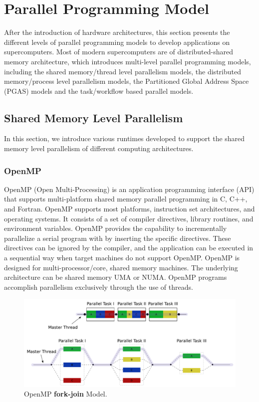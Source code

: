 \section{Parallel Programming Model}\label{Parallel Programming Model}

After the introduction of hardware architectures, this section presents the different levels of parallel programming models to develop applications on supercomputers. Most of modern supercomputers are of distributed-shared memory architecture, which introduces multi-level parallel programming models, including the shared memory/thread level parallelism models, the distributed memory/process level parallelism models, the Partitioned Global Address Space (PGAS) models and the task/workflow based parallel models.

\subsection{Shared Memory Level Parallelism}

In this section, we introduce various runtimes developed to support the shared memory level parallelism of different computing architectures. 

\subsubsection{OpenMP}

OpenMP (Open Multi-Processing) \cite{dagum1998openmp} is an application programming interface (API) that supports multi-platform shared memory parallel programming in C, C++, and Fortran. OpenMP supports most platforms, instruction set architectures, and operating systems. It consists of a set of compiler directives, library routines, and environment variables. OpenMP provides the capability to incrementally parallelize a serial program with by inserting the specific directives. These directives can be ignored by the compiler, and the application can be executed in a sequential way when target machines do not support OpenMP. OpenMP is designed for multi-processor/core, shared memory machines. The underlying architecture can be shared memory UMA or NUMA. OpenMP programs accomplish parallelism exclusively through the use of threads.

\begin{figure}[htbp]
	\centering
	\includegraphics[width=6.4in]{fig/Fork_join.pdf}
	\caption{OpenMP \textbf{fork-join} Model.}
	\label{openmp_fork_join}
\end{figure}

